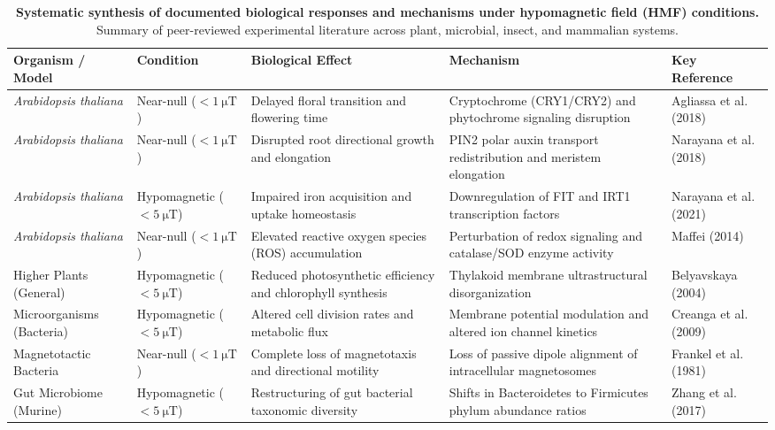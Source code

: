 \begin{table}[t]
\centering
\footnotesize
\caption{\textbf{Systematic synthesis of documented biological responses and mechanisms under hypomagnetic field (HMF) conditions.} Summary of peer-reviewed experimental literature across plant, microbial, insect, and mammalian systems.}
\label{tab:mars_biology_review}
\begin{tabular}{p{2.8cm}p{2.2cm}p{3.4cm}p{4.4cm}p{3.0cm}}
\toprule
\textbf{Organism / Model} & \textbf{Condition} & \textbf{Biological Effect} & \textbf{Mechanism} & \textbf{Key Reference} \\
\midrule
\textit{Arabidopsis thaliana} & Near-null ($<\SI{1}{\micro\tesla}$) & Delayed floral transition and flowering time & Cryptochrome (CRY1/CRY2) and phytochrome signaling disruption & Agliassa et al. (2018) \citep{Agliassa2018} \\
\textit{Arabidopsis thaliana} & Near-null ($<\SI{1}{\micro\tesla}$) & Disrupted root directional growth and elongation & PIN2 polar auxin transport redistribution and meristem elongation & Narayana et al. (2018) \citep{Narayana2018} \\
\textit{Arabidopsis thaliana} & Hypomagnetic ($<\SI{5}{\micro\tesla}$) & Impaired iron acquisition and uptake homeostasis & Downregulation of FIT and IRT1 transcription factors & Narayana et al. (2021) \citep{Narayana2021} \\
\textit{Arabidopsis thaliana} & Near-null ($<\SI{1}{\micro\tesla}$) & Elevated reactive oxygen species (ROS) accumulation & Perturbation of redox signaling and catalase/SOD enzyme activity & Maffei (2014) \citep{Maffei2014} \\
Higher Plants (General) & Hypomagnetic ($<\SI{5}{\micro\tesla}$) & Reduced photosynthetic efficiency and chlorophyll synthesis & Thylakoid membrane ultrastructural disorganization & Belyavskaya (2004) \citep{Belyavskaya2004} \\
Microorganisms (Bacteria) & Hypomagnetic ($<\SI{5}{\micro\tesla}$) & Altered cell division rates and metabolic flux & Membrane potential modulation and altered ion channel kinetics & Creanga et al. (2009) \citep{Creanga2009} \\
Magnetotactic Bacteria & Near-null ($<\SI{1}{\micro\tesla}$) & Complete loss of magnetotaxis and directional motility & Loss of passive dipole alignment of intracellular magnetosomes & Frankel et al. (1981) \citep{Frankel1981} \\
Gut Microbiome (Murine) & Hypomagnetic ($<\SI{5}{\micro\tesla}$) & Restructuring of gut bacterial taxonomic diversity & Shifts in Bacteroidetes to Firmicutes phylum abundance ratios & Zhang et al. (2017) \citep{Zhang2017} \\

\end{tabular}
\end{table}
